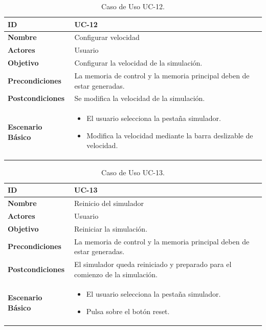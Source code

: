 \begin{center}
\begin{table}[htbp]
\centering
\begin{tabular}{@{}p{2.5cm} p{9cm}@{}} 
\toprule
\textbf{ID}	& UC-12  \\
\midrule
\textbf{Nombre} 		& Configurar velocidad  \\
\midrule
\textbf{Actores} 		&	Usuario  \\
\midrule
\textbf{Objetivo} 	&	Configurar la velocidad de la simulación.	 \\
\midrule
\textbf{Precondiciones}	&	La memoria de control y la memoria principal deben de estar generadas.  \\
\midrule
\textbf{Postcondiciones} 	& Se modifica la velocidad de la simulación.   \\
\midrule
\textbf{Escenario Básico} 	&  \begin{itemize}
\item El usuario selecciona la pestaña simulador.
\item Modifica la velocidad mediante la barra deslizable de velocidad.
\end{itemize} \\
\bottomrule
\end{tabular}
\caption{Caso de Uso UC-12.}
\label{tab:uc12}
\end{table}
\end{center}

\begin{center}
\begin{table}[htbp]
\centering
\begin{tabular}{@{}p{2.5cm} p{9cm}@{}} 
\toprule
\textbf{ID}	& UC-13  \\
\midrule
\textbf{Nombre} 		& Reinicio del simulador  \\
\midrule
\textbf{Actores} 		&	Usuario  \\
\midrule
\textbf{Objetivo} 	&	Reiniciar la simulación.	 \\
\midrule
\textbf{Precondiciones}	&	La memoria de control y la memoria principal deben de estar generadas.  \\
\midrule
\textbf{Postcondiciones} 	& El simulador queda reiniciado y preparado para el comienzo de la simulación.   \\
\midrule
\textbf{Escenario Básico} 	&  \begin{itemize}
\item El usuario selecciona la pestaña simulador.
\item Pulsa sobre el botón reset.
\end{itemize} \\
\bottomrule
\end{tabular}
\caption{Caso de Uso UC-13.}
\label{tab:uc13}
\end{table}
\end{center}


